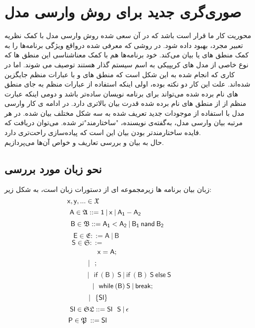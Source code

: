
\chapter{صوری‌گری جدید برای روش وارسی مدل}

محوریت کار ما قرار است\cite{calcul} باشد که در آن سعی شده روش وارسی مدل با کمک نظریه تعبیر مجرد، بهبود داده شود. در\cite{clarke} روشی که معرفی شده در‌واقع ویژگی برنامه‌ها را به کمک منطق های  یا  بیان می‌کند. خود برنامه‌ها هم با کمک معناشناسی این منطق ها که نوع خاصی از مدل های کریپیکی به اسم سیستم گذار هستند توصیف می شوند. اما در\cite{calcul} کاری که انجام شده به این شکل است که منطق های  و  با عبارات منظم\cite{kleene56} جایگزین شده‌اند. علت این کار دو نکته بوده، اولی اینکه استفاده از عبارات منظم به جای منطق های نام برده شده می‌تواند برای برنامه نویسان ساده‌تر باشد و دومی اینکه عبارت منظم از از منطق های نام برده شده قدرت بیان بالاتری دارد.\cite{regisbetter} در ادامه ی کار وارسی مدل با استفاده از موجودات جدید تعریف شده به سه شکل مختلف بیان شده. در هر مرتبه بیان وارسی مدل، به‌گفته‌ی نویسنده، "ساختارمند"تر شده. می‌توان دریافت که فایده ساختارمندتر بودن بیان این است که پیاده‌سازی راحت‌تری دارد.\\
حال به بیان و بررسی تعاریف و خواص آن‌ها می‌پردازیم.

\section{نحو زبان مورد بررسی‬}

زبان بیان برنامه ها زیرمجموعه ای از دستورات زبان  است، به شکل زیر:
$$\mathsf{x,y},... \in \mathfrak{X}\hspace{4.65cm}$$
$$\mathsf{A} \in \mathfrak{A} ::=\mathsf{1\:|\:x\:|\:A_1 - A_2\hspace{2.4cm}}$$  
$$\mathsf{B \in \mathfrak{B} ::=A_1<A_2 \:|\: B_1 \: nand\: B_2\hspace{1.2cm}}$$
$$\mathsf{E \in \mathfrak{E}::= A \: | \: B\hspace{4cm}}$$
$$\mathsf{S\in \mathfrak{S} ::=\hspace{5cm}  }$$
$$\mathsf{x=A; \hspace{2.25cm}}$$
$$\mathsf{|\:\:\:;\hspace{3.75cm}}$$
$$\mathsf{|\:\:\:if\:(B)\:S\:|\:if\:(B)\:S\:else\:S}$$
$$\mathsf{|\:\:\:while\:(B)\:S\: | \: break;\hspace{0.65cm}}$$
$$\mathsf{|\:\:\:\{Sl\}\hspace{3.15cm}}$$
$$\mathsf{Sl \in \mathfrak{SL}::=Sl\:\:\:S\:|\:\epsilon}\hspace{3.05cm}$$
$$\mathsf{P\in \mathfrak{P}\:::=Sl}\hspace{4.25cm}$$

